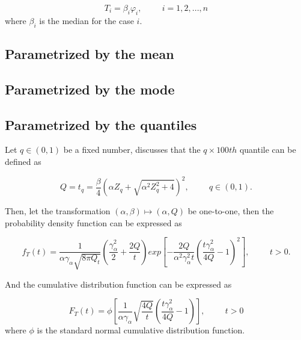 \documentclass[12pt]{article}%
\numberwithin{equation}{section} %
\begin{document}
\begin{equation}
    T_i = \beta_i \varphi_i, \hspace{1cm} i=1, 2, . . . , n
\end{equation}
where $\beta_i$ is the median for the case $i$. 




\subsection{Parametrized by the mean}



\cite{santos2012}


\subsection{Parametrized by the mode}

\cite{bourguignon2022}

\subsection{Parametrized by the quantiles}

Let $q\in(0,1)$ be a fixed number, \citeauthor{sanchez2021} discusses that the $q \times100th$ quantile can be defined as

\begin{equation}
    Q = t_q = \frac{\beta}{4}\left(\alpha Z_q +  \sqrt{\alpha^2 Z_q^2 + 4}\right)^2, \hspace{1cm} q\in(0,1).
\end{equation}

Then, let the transformation $(\alpha, \beta) \mapsto (\alpha, Q)$ be one-to-one, then the probability density function can be expressed as

\begin{equation}
    f_T(t) = \frac{1}{\alpha \gamma_{\alpha} \sqrt{8 \pi Q_t}}\left(\frac{\gamma_{\alpha}^2}{2}+ \frac{2Q}{t}\right) exp \left[-\frac{2Q}{\alpha^2 \gamma_{\alpha}^2 t}\left(\frac{t \gamma_{\alpha}^2}{4Q}-1\right)^2\right], \hspace{1cm} t>0.
\end{equation}

And the cumulative distribution function can be expressed as 

\begin{equation}
    F_T(t) = \phi \left[\frac{1}{\alpha \gamma_{\alpha}}\sqrt{\frac{4Q}{t}}\left(\frac{t\gamma_{\alpha}^2}{4Q}-1\right) \right], \hspace{1cm} t>0
\end{equation}
where $\phi$ is the  standard normal cumulative distribution function.
\end{document}
